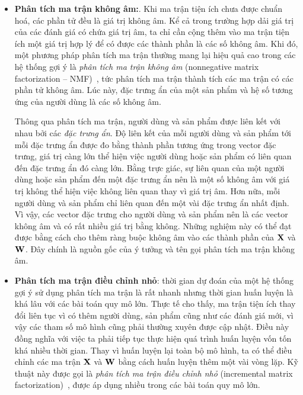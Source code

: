 \begin{itemize}
\item \textbf{Phân tích ma trận không âm:}. Khi ma trận tiện ích chưa được
chuẩn hoá, các phần tử đều là giá trị không âm. Kể cả trong trường hợp dải
giá trị của các đánh giá có chứa giá trị âm, ta chỉ cần cộng thêm vào ma
trận tiện ích một giá trị hợp lý để có được các thành phần là các số
không âm. Khi đó, một phương pháp phân tích ma trận thường mang lại hiệu quả cao trong các hệ thống gợi ý là \textit{phân tích ma trận không âm} ({nonnegative matrix factorization} -- NMF)~\cite{zhang2006learning}, tức phân tích ma trận thành tích các ma
trận có các phần tử không âm. Lúc này, đặc trưng ẩn của một sản phẩm và hệ số tương ứng của người dùng là các số không âm.

Thông qua phân tích ma trận, người dùng và sản phẩm được liên
kết với nhau bởi các \textit{đặc trưng ẩn}. Độ liên kết của mỗi
người dùng và sản phẩm tới mỗi đặc trưng ẩn được đo bằng thành phần tương
ứng trong vector đặc trưng, giá trị càng lớn thể hiện việc
người dùng hoặc sản phẩm có liên quan đến đặc trưng ẩn đó càng lớn.
Bằng trực giác, sự liên quan của một người dùng hoặc sản phẩm đến
một đặc trưng ẩn nên là một số không âm với giá trị không thể hiện việc không liên quan thay vì giá trị âm. Hơn nữa, mỗi người dùng và sản phẩm chỉ liên quan đến một vài đặc trưng ẩn nhất định. Vì vậy, các vector
đặc trưng cho người dùng và sản phẩm nên là các vector không âm và
có rất nhiều giá trị bằng không. Những nghiệm này có thể đạt được bằng cách cho
thêm ràng buộc không âm vào các thành phần của $\mathbf{X}$ và $\mathbf{W}$. Đây
chính là nguồn gốc của ý tưởng và tên gọi phân tích ma trận không âm.


\item \textbf{Phân tích ma trận điều chỉnh nhỏ}: thời gian dự
đoán của một hệ thống gợi ý sử dụng phân tích ma trận là rất nhanh nhưng
thời gian huấn luyện là khá lâu với các bài toán quy mô lớn. Thực tế cho thấy,
ma trận tiện ích thay đổi liên tục vì có thêm người dùng, sản phẩm cũng như
các đánh giá mới, vì vậy các tham số mô hình cũng phải thường xuyên được cập
nhật. Điều này đồng nghĩa với việc ta phải tiếp tục thực hiện quá trình huấn
luyện vốn tốn khá nhiều thời gian. Thay vì huấn luyện lại toàn bộ mô hình,
ta có thể điều chỉnh các ma trận $\mathbf{X}$ và $\mathbf{W}$ bằng cách huấn luyện thêm
một vài vòng lặp. Kỹ thuật này được gọi là \textit{phân tích ma trận điều
chỉnh nhỏ} ({incremental matrix factorization})~\cite{vinagre2014fast}, được
áp dụng nhiều trong các bài toán quy mô lớn.



\end{itemize}
